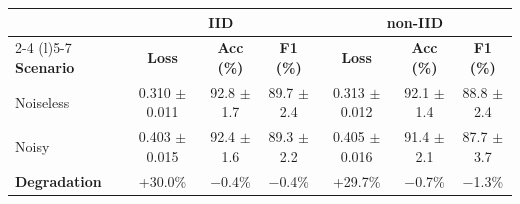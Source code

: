 \begin{tabular}{l ccc ccc}
\toprule
 & \multicolumn{3}{c}{\textbf{IID}} & \multicolumn{3}{c}{\textbf{non-IID}} \\
\cmidrule(r){2-4} \cmidrule(l){5-7}
\textbf{Scenario} & \textbf{Loss} & \textbf{Acc (\%)} & \textbf{F1 (\%)} & \textbf{Loss} & \textbf{Acc (\%)} & \textbf{F1 (\%)} \\
\midrule
Noiseless & 0.310 $\pm$ 0.011 & 92.8 $\pm$ 1.7 & 89.7 $\pm$ 2.4 & 0.313 $\pm$ 0.012 & 92.1 $\pm$ 1.4 & 88.8 $\pm$ 2.4 \\
Noisy & 0.403 $\pm$ 0.015 & 92.4 $\pm$ 1.6 & 89.3 $\pm$ 2.2 & 0.405 $\pm$ 0.016 & 91.4 $\pm$ 2.1 & 87.7 $\pm$ 3.7 \\
\textbf{Degradation} & +30.0\% & $-$0.4\% & $-$0.4\% & +29.7\% & $-$0.7\% & $-$1.3\% \\
\bottomrule
\end{tabular}